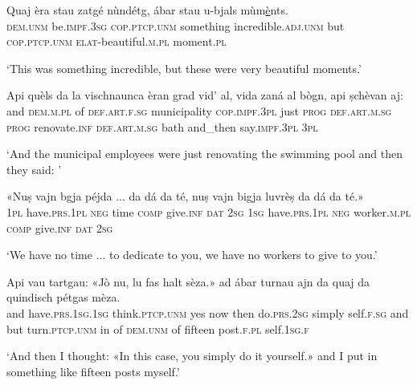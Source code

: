 \begin{linenumbers}
\gll  Quaj èra stau zatgé nùndétg, ábar stau u-bjals mùm\underline{è}nts.\\
 \textsc{dem.unm} be.\textsc{impf.3sg} \textsc{cop.ptcp.unm} something incredible.\textsc{adj.unm} but \textsc{cop.ptcp.unm}  \textsc{elat}-beautiful.\textsc{m.pl} moment.\textsc{pl} \\
\end{linenumbers}
\medskip
\glt `This was something incredible, but these were very beautiful moments.'
\medskip

\begin{linenumbers}
\gll  Api quèls da la vischnaunca èran grad vid' al, vida zaná al bògn, api ṣchèvan aj:  \\
and \textsc{dem.m.pl} of \textsc{def.art.f.sg} municipality \textsc{cop.impf.3pl} just \textsc{prog} \textsc{def.art.m.sg} \textsc{prog} renovate.\textsc{inf} \textsc{def.art.m.sg} bath and\_then say.\textsc{impf.3pl} \textsc{3pl} \\
\end{linenumbers}
\medskip
\glt `And the municipal employees were just renovating the swimming pool and then they said: '
\medskip

\begin{linenumbers}
\gll «Nuṣ vajn bgja péjda ... da dá da té, nuṣ vajn bigja luvrèṣ da dá da té.»   \\
 \textsc{1pl} have.\textsc{prs.1pl} \textsc{neg} time {} \textsc{comp} give.\textsc{inf} \textsc{dat} \textsc{2sg} \textsc{1sg} have.\textsc{prs.1pl} \textsc{neg} worker.\textsc{m.pl} \textsc{comp} give.\textsc{inf} \textsc{dat} \textsc{2sg}\\
\end{linenumbers}
\medskip
\glt `We have no time ... to dedicate to you, we have no workers to give to you.'
\medskip

\begin{linenumbers}
\gll  Api vau tartgau: «Jò nu\footnotemark, lu fas halt sèza.» ad ábar turnau ajn da quaj da quindisch pétgas mèza.  \\
and have.\textsc{prs.1sg.1sg} think.\textsc{ptcp.unm} yes now then  do.\textsc{prs.2sg} simply self.\textsc{f.sg} and but turn.\textsc{ptcp.unm} in of \textsc{dem.unm} of fifteen post.\textsc{f.pl} self.\textsc{1sg.f} \\
\end{linenumbers}
\medskip
\glt `And then I thought: «In this case, you simply do it yourself.» and I put in something like fifteen posts myself.'
\medskip

